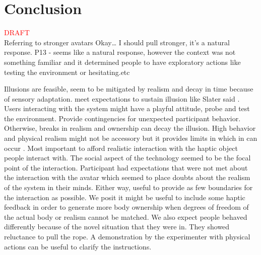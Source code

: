 \section{Conclusion}
\textcolor{red}{DRAFT}\\
Referring to stronger avatars 
Okay… I should pull stronger, it’s a natural response. P13 - seems like a natural response, however the context was not something familiar and it determined people to have exploratory actions like testing the environment or hesitating.etc

Illusions are feasible, seem to be mitigated by realism and decay in time because of sensory adaptation. meet expectations to sustain illusion like Slater said \cite{slater2009place}. Users interacting with the system might have a playful attitude, probe and test the environment. Provide contingencies for unexpected participant behavior. Otherwise, breaks in realism and ownership can decay the illusion. High behavior and physical realism might not be accessory but it provides limits in which in can occur \cite{slater2009place}. Most important to afford realistic interaction with the haptic object people interact with. The social aspect of the technology seemed to be the focal point of the interaction. Participant had expectations that were not met about the interaction with the avatar which seemed to place doubts about the realism of the system in their minds. Either way, useful to provide as few boundaries for the interaction as possible. We posit it might be useful to include some haptic feedback in order to generate more body ownership when degrees of freedom of the actual body or realism cannot be matched. We also expect people behaved differently because of the novel situation that they were in. They showed reluctance to pull the rope. A demonstration by the experimenter with physical actions can be useful to clarify the instructions.
